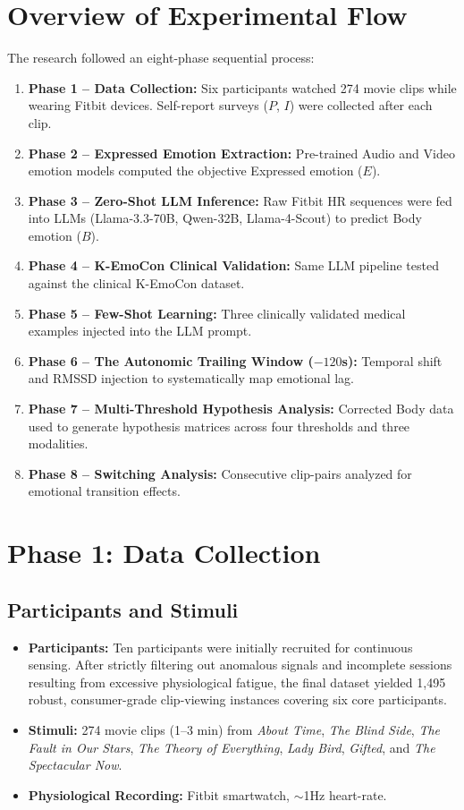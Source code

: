 \documentclass[11pt, a4paper]{report}
\begin{document}
\section{Overview of Experimental Flow}
The research followed an eight-phase sequential process:
\begin{enumerate}
    \item \textbf{Phase 1 -- Data Collection:} Six participants watched 274 movie clips while wearing Fitbit devices. Self-report surveys ($P$, $I$) were collected after each clip.
    \item \textbf{Phase 2 -- Expressed Emotion Extraction:} Pre-trained Audio and Video emotion models computed the objective Expressed emotion ($E$).
    \item \textbf{Phase 3 -- Zero-Shot LLM Inference:} Raw Fitbit HR sequences were fed into LLMs (Llama-3.3-70B, Qwen-32B, Llama-4-Scout) to predict Body emotion ($B$).
    \item \textbf{Phase 4 -- K-EmoCon Clinical Validation:} Same LLM pipeline tested against the clinical K-EmoCon dataset.
    \item \textbf{Phase 5 -- Few-Shot Learning:} Three clinically validated medical examples injected into the LLM prompt.
    \item \textbf{Phase 6 -- The Autonomic Trailing Window ($-120$s):} Temporal shift and RMSSD injection to systematically map emotional lag.
    \item \textbf{Phase 7 -- Multi-Threshold Hypothesis Analysis:} Corrected Body data used to generate hypothesis matrices across four thresholds and three modalities.
    \item \textbf{Phase 8 -- Switching Analysis:} Consecutive clip-pairs analyzed for emotional transition effects.
\end{enumerate}

\section{Phase 1: Data Collection}
\subsection{Participants and Stimuli}
\begin{itemize}
    \item \textbf{Participants:} Ten participants were initially recruited for continuous sensing. After strictly filtering out anomalous signals and incomplete sessions resulting from excessive physiological fatigue, the final dataset yielded 1,495 robust, consumer-grade clip-viewing instances covering six core participants.
    \item \textbf{Stimuli:} 274 movie clips (1--3 min) from \textit{About Time}, \textit{The Blind Side}, \textit{The Fault in Our Stars}, \textit{The Theory of Everything}, \textit{Lady Bird}, \textit{Gifted}, and \textit{The Spectacular Now}.
    \item \textbf{Physiological Recording:} Fitbit smartwatch, $\sim$1Hz heart-rate.
\end{itemize}
\end{document}
